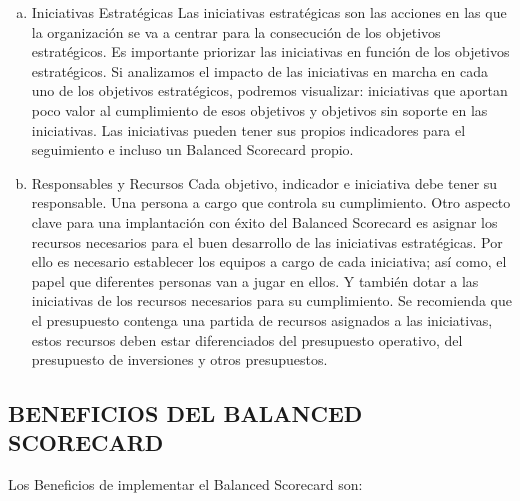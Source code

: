 \begin{enumerate}[a)]
\begin{itemize}
    
 		  \end{itemize}


	 \item Iniciativas Estratégicas
		Las iniciativas estratégicas son las acciones en las que la organización se va a centrar para la consecución de los objetivos estratégicos. Es importante priorizar las iniciativas en función de los objetivos estratégicos. Si analizamos el impacto de las iniciativas en marcha en cada uno de los objetivos estratégicos, podremos visualizar: iniciativas que aportan poco valor al cumplimiento de esos objetivos y objetivos sin soporte en las iniciativas. Las iniciativas pueden tener sus propios indicadores para el seguimiento e incluso un Balanced Scorecard propio.

	\item Responsables y Recursos
		Cada objetivo, indicador e iniciativa debe tener su responsable. Una persona a cargo que controla su cumplimiento.
Otro aspecto clave para una implantación con éxito del Balanced Scorecard es asignar los recursos necesarios para el buen desarrollo de las iniciativas estratégicas. Por ello es necesario establecer los equipos a cargo de cada iniciativa; así como, el papel que diferentes personas van a jugar en ellos. Y también dotar a las iniciativas de los recursos necesarios para su cumplimiento. Se recomienda que el presupuesto contenga una partida de recursos asignados a las iniciativas, estos recursos deben estar diferenciados del presupuesto operativo, del presupuesto de inversiones y otros presupuestos.

    \end{enumerate}


\subsection{ BENEFICIOS DEL BALANCED SCORECARD}

	Los Beneficios de implementar el Balanced Scorecard son:

